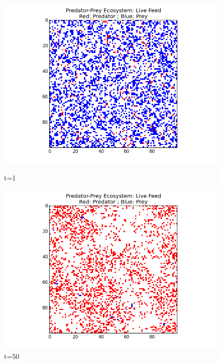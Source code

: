 \documentclass[a4paper,12pt]{article}
\begin{document}
  \begin{figure}[H]
  \centering
	\begin{minipage}[b]{.45\linewidth}
		 \includegraphics[width = 1\linewidth]{./pics/ecosystem_snapshot_1.png} 
		 \caption{t=1}
	\end{minipage}
	\quad
	\begin{minipage}[b]{.45\linewidth}	
		 \includegraphics[width = 1\linewidth]{./pics/ecosystem_snapshot_50.png} 
                 \caption{t=50}
        \end{minipage}  
  \end{figure}
\end{document}
